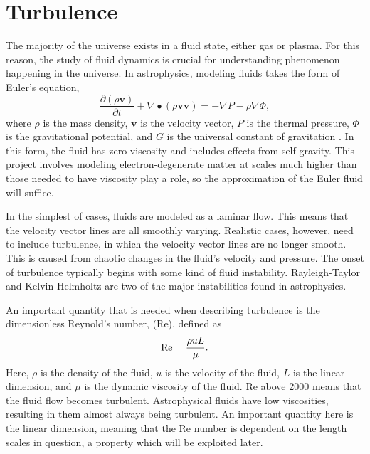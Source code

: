 \documentclass{aastex63}
\begin{document}
\section{Turbulence} \label{subsec:tables}

The majority of the universe exists in a fluid state, either gas or plasma. For this reason, the study of fluid dynamics is crucial for understanding phenomenon happening in the universe. In astrophysics, modeling fluids takes the form of Euler's equation,
\begin{equation*}
        \frac{\partial (\rho \textbf{v})}{\partial t} + \nabla \bullet (\rho \textbf{vv}) = -\nabla P - \rho \nabla \Phi,
\end{equation*}
where $\rho$ is the mass density, $\textbf{v}$ is the velocity vector, $P$ is the thermal pressure, $\Phi$ is the gravitational potential, and $G$ is the universal constant of gravitation \cite{euler}. In this form, the  fluid has zero viscosity and includes effects from self-gravity. This project involves modeling electron-degenerate matter at scales much higher than those needed to have viscosity play a role, so the approximation of the Euler fluid will suffice.

In the simplest of cases, fluids are modeled as a laminar flow. This means that the velocity vector lines are all smoothly varying. Realistic cases, however, need to include turbulence, in which the velocity vector lines are no longer smooth. This is caused from chaotic changes in the fluid's velocity and pressure. The onset of turbulence typically begins with some kind of fluid instability. Rayleigh-Taylor and Kelvin-Helmholtz are two of the major instabilities found in astrophysics.

An important quantity that is needed when describing turbulence is the dimensionless Reynold's number, (Re), defined as
\begin{equation*}
        {\rm Re} = \frac{\rho u L}{\mu}.
\end{equation*}
Here, $\rho$ is the density of the fluid, $u$ is the velocity of the fluid, $L$ is the linear dimension, and $\mu$ is the dynamic viscosity of the fluid. Re above 2000 means that the fluid flow becomes turbulent. Astrophysical fluids have low viscosities, resulting in them almost always being turbulent. An important quantity here is the linear dimension, meaning that the Re number is dependent on the length scales in question, a property which will be exploited later.
\end{document}

